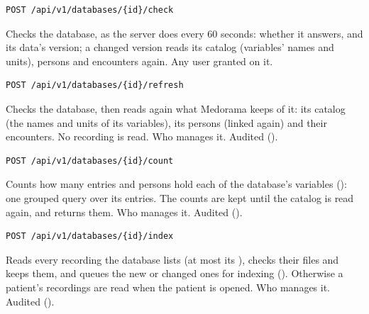 \begin{lstlisting}[style=signature]
POST /api/v1/databases/{id}/check
\end{lstlisting}
Checks the database, as the server does every 60 seconds: whether it answers, and its data's
version; a changed version reads its catalog (variables' names and units), persons and
encounters again. Any user granted
 on it.

\begin{lstlisting}[style=signature]
POST /api/v1/databases/{id}/refresh
\end{lstlisting}
Checks the database, then reads again what Medorama keeps of it: its catalog (the names and
units of its variables), its persons (linked again) and their encounters. No recording is read.
Who manages it. Audited ().

\begin{lstlisting}[style=signature]
POST /api/v1/databases/{id}/count
\end{lstlisting}
Counts how many entries and persons hold each of the database's variables (): one
grouped query over its entries. The counts are kept until the catalog is read again, and
 returns them. Who manages it. Audited ().

\begin{lstlisting}[style=signature]
POST /api/v1/databases/{id}/index
\end{lstlisting}
Reads every recording the database lists (at most its ), checks their files and
keeps them, and queues the new or changed ones for indexing ().
Otherwise a patient's recordings are read when the patient is opened. Who manages it. Audited
().

